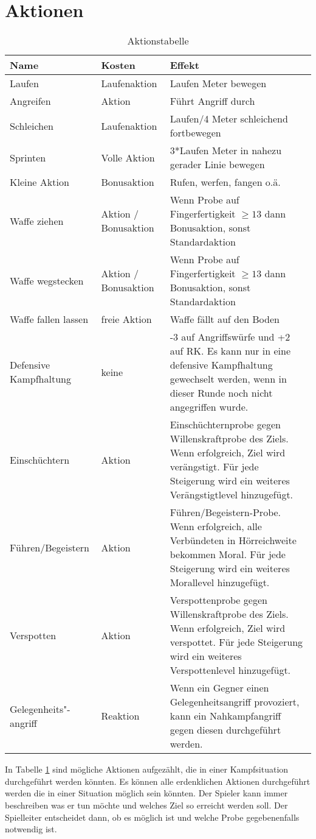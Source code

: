 \documentclass[../../Heldenanleitung2]{subfiles}
\begin{document}
\section{Aktionen}
\renewcommand{\arraystretch}{1.5}
{
\begin{table}
\caption{Aktionstabelle}
\label{tab:Aktionen}
\begin{tabular}{|p{}|p{}|p{}|}
\hline
Name & Kosten & Effekt\\
\hline
Laufen & Laufenaktion & Laufen Meter bewegen \\
Angreifen & Aktion & Führt Angriff durch \\
Schleichen & Laufenaktion & Laufen/4 Meter schleichend fortbewegen\\
Sprinten & Volle Aktion & 3*Laufen Meter in nahezu gerader Linie bewegen\\
Kleine Aktion & Bonusaktion & Rufen, werfen, fangen o.ä.\\
Waffe ziehen & Aktion / Bonusaktion & Wenn Probe auf Fingerfertigkeit $\geq 13$ dann Bonusaktion, sonst Standardaktion\\
Waffe wegstecken & Aktion / Bonusaktion & Wenn Probe auf Fingerfertigkeit $\geq 13$ dann Bonusaktion, sonst Standardaktion\\
Waffe fallen lassen & freie Aktion & Waffe fällt auf den Boden\\
Defensive Kampfhaltung & keine & -3 auf Angriffswürfe und +2 auf RK. Es kann nur in eine defensive Kampfhaltung gewechselt werden, wenn in dieser Runde noch nicht angegriffen wurde.\\
Einschüchtern & Aktion & Einschüchternprobe gegen Willenskraftprobe des Ziels. Wenn erfolgreich, Ziel wird verängstigt. Für jede Steigerung wird ein weiteres Verängstigtlevel hinzugefügt.\\
Führen/Begeistern & Aktion & Führen/Begeistern-Probe. Wenn erfolgreich, alle Verbündeten in Hörreichweite bekommen Moral. Für jede Steigerung wird ein weiteres Morallevel hinzugefügt.\\
Verspotten & Aktion & Verspottenprobe gegen Willenskraftprobe des Ziels. Wenn erfolgreich, Ziel wird verspottet. Für jede Steigerung wird ein weiteres Verspottenlevel hinzugefügt.\\
Gelegenheits"-angriff & Reaktion & Wenn ein Gegner einen Gelegenheitsangriff provoziert, kann ein Nahkampfangriff gegen diesen durchgeführt werden.\\
\hline
\end{tabular}
\end{table}
}
In Tabelle \ref{tab:Aktionen} sind mögliche Aktionen aufgezählt, die in einer Kampfsituation durchgeführt werden könnten. Es können alle erdenklichen Aktionen durchgeführt werden die in einer Situation möglich sein könnten. Der Spieler kann immer beschreiben was er tun möchte und welches Ziel so erreicht werden soll. Der Spielleiter entscheidet dann, ob es möglich ist und welche Probe gegebenenfalls notwendig ist.
\end{document}
